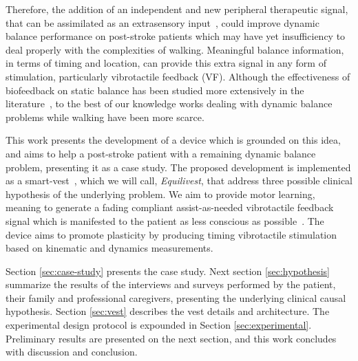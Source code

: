 \documentclass[conference]{IEEEtran}
\begin{document}

Therefore, the addition of an independent and new peripheral therapeutic signal, that can be assimilated as an extrasensory input~\cite{Brandebusemeyer.etal2021},  could improve dynamic balance performance on post-stroke patients which may have yet insufficiency to deal properly with the complexities of walking.  Meaningful balance information, in terms of timing and location, can provide this extra signal in any form of stimulation, particularly vibrotactile feedback (VF).  Although the effectiveness of biofeedback on static balance has been studied more extensively in the literature~\cite{DeAngelis.etal2021}, to the best of our knowledge works dealing with dynamic balance problems while walking have been more scarce.

This work presents the development of a device which is grounded on this idea, and aims to help a post-stroke patient with a remaining dynamic balance problem, presenting it as a case study.  The proposed development is implemented as a smart-vest~\cite{Brandebusemeyer.etal2021}, which we will call, \textit{Equilivest}, that address three possible clinical hypothesis of the underlying problem.  We aim to provide motor learning, meaning to generate a fading compliant assist-as-needed vibrotactile feedback signal which is manifested to the patient as less conscious as possible~\cite{Srivastava.etal2016,Donato.etal2016}.  The device aims to promote plasticity by producing timing vibrotactile stimulation based on kinematic and dynamics measurements.  



Section \ref{sec:case-study} presents the case study.  Next section \ref{sec:hypothesis} summarize the results of the interviews and surveys performed by the patient, their family and professional caregivers, presenting the underlying clinical causal hypothesis.  Section \ref{sec:vest} describes the vest details and architecture.  The experimental design protocol is expounded in Section \ref{sec:experimental}.  Preliminary results are presented on the next section, and this work concludes with discussion and conclusion.
\end{document}
